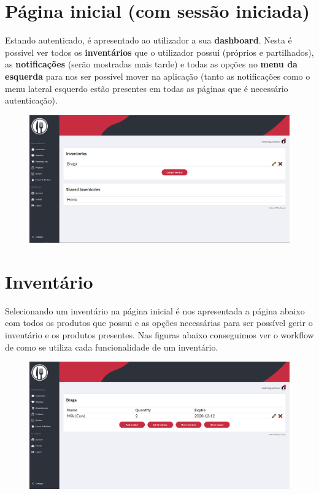 \documentclass[a4paper]{report}
\begin{document}
    \section{Página inicial (com sessão iniciada)}

    Estando autenticado, é apresentado ao utilizador a sua \textbf{dashboard}.
    Nesta é possivel ver todos os \textbf{inventários} que o utilizador possui
    (próprios e partilhados), as \textbf{notificações} (serão mostradas mais 
    tarde) e todas as opções no \textbf{menu da esquerda} para nos ser 
    possível mover na aplicação (tanto as notificações como o menu lateral 
    esquerdo estão presentes em todas as páginas que é necessário 
    autenticação).

    \begin{figure}[H]
        \centering
            \includegraphics[width=\textwidth]{images/produto_final/inicial.png}
    \end{figure}

    \section{Inventário}

    Selecionando um inventário na página inicial é nos apresentada a página
    abaixo com todos os produtos que possui e as opções necessárias para 
    ser possível gerir o inventário e os produtos presentes. Nas figuras
    abaixo conseguimos ver o workflow de como se utiliza cada funcionalidade
    de um inventário.

    \begin{figure}[H]
        \centering
            \includegraphics[width=\textwidth]{images/produto_final/iventario.png}
    \end{figure}
\end{document}
